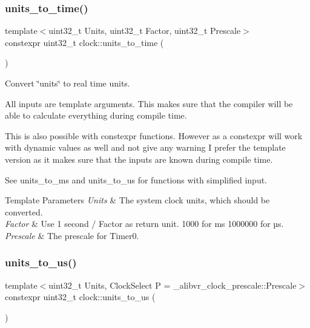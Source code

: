 \subsubsection{\texorpdfstring{units\+\_\+to\+\_\+time()}{units\_to\_time()}}
{\footnotesize\ttfamily template$<$uint32\+\_\+t Units, uint32\+\_\+t Factor, uint32\+\_\+t Prescale$>$ \\
constexpr uint32\+\_\+t clock\+::units\+\_\+to\+\_\+time (\begin{DoxyParamCaption}{ }\end{DoxyParamCaption})}



Convert \char`\"{}units\char`\"{} to real time units. 

All inputs are template arguments. This makes sure that the compiler will be able to calculate everything during compile time.

This is also possible with {\ttfamily constexpr} functions. However as a {\ttfamily constexpr} will work with dynamic values as well and not give any warning I prefer the template version as it makes sure that the inputs are known during compile time.

See units\+\_\+to\+\_\+ms and units\+\_\+to\+\_\+us for functions with simplified input.


\begin{DoxyTemplParams}{Template Parameters}
{\em Units} & The system clock units, which should be converted. \\
\hline
{\em Factor} & Use 1 second / Factor as return unit. 1\textquotesingle{}000 for ms 1\textquotesingle{}000\textquotesingle{}000 for µs. \\
\hline
{\em Prescale} & The prescale for {\ttfamily Timer0}. \\
\hline
\end{DoxyTemplParams}
\hypertarget{namespaceclock_a320b3614df868e901b2f022f70a3d8ae}{}\label{namespaceclock_a320b3614df868e901b2f022f70a3d8ae} 
\subsubsection{\texorpdfstring{units\+\_\+to\+\_\+us()}{units\_to\_us()}}
{\footnotesize\ttfamily template$<$uint32\+\_\+t Units, Clock\+Select P = \+\_\+alibvr\+\_\+clock\+\_\+prescale\+::\+Prescale$>$ \\
constexpr uint32\+\_\+t clock\+::units\+\_\+to\+\_\+us (\begin{DoxyParamCaption}{ }\end{DoxyParamCaption})\hspace{0.3cm}{\ttfamily [inline]}}



